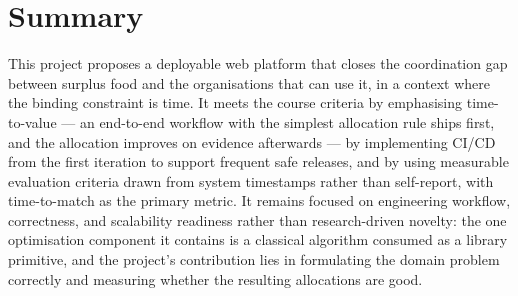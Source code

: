 \documentclass[11pt,a4paper]{article}
\begin{document}
\section{Summary}
This project proposes a deployable web platform that closes the coordination gap between surplus food and the organisations that can use it, in a context where the binding constraint is time. It meets the course criteria by emphasising time-to-value --- an end-to-end workflow with the simplest allocation rule ships first, and the allocation improves on evidence afterwards --- by implementing CI/CD from the first iteration to support frequent safe releases, and by using measurable evaluation criteria drawn from system timestamps rather than self-report, with time-to-match as the primary metric. It remains focused on engineering workflow, correctness, and scalability readiness rather than research-driven novelty: the one optimisation component it contains is a classical algorithm consumed as a library primitive, and the project's contribution lies in formulating the domain problem correctly and measuring whether the resulting allocations are good.
\end{document}
